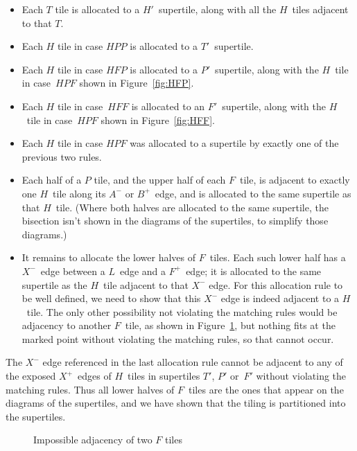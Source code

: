 \begin{itemize}
  \item Each $T$ tile is allocated to a $H'$~supertile, along with all
    the $H$~tiles adjacent to that $T$.
  \item Each $H$ tile in case $HPP$ is allocated to a $T'$~supertile.
  \item Each $H$ tile in case $HFP$ is allocated to a $P'$~supertile,
    along with the $H$~tile in case~$HPF$ shown in
    Figure~\ref{fig:HFP}.
  \item Each $H$ tile in case~$HFF$ is allocated to an $F'$~supertile,
    along with the $H$~tile in case~$HPF$ shown in
    Figure~\ref{fig:HFF}.
  \item Each $H$ tile in case $HPF$ was allocated to a supertile by
    exactly one of the previous two rules.
  \item Each half of a $P$ tile, and the upper half of each $F$~tile,
    is adjacent to exactly one $H$~tile along its $A^-$ or $B^+$~edge,
    and is allocated to the same supertile as that $H$~tile.  (Where
    both halves are allocated to the same supertile, the bisection
    isn't shown in the diagrams of the supertiles, to simplify those
    diagrams.)
  \item It remains to allocate the lower halves of $F$~tiles.  Each
    such lower half has a $X^-$~edge between a $L$~edge and a
    $F^+$~edge; it is allocated to the same supertile as the $H$~tile
    adjacent to that $X^-$ edge.  For this allocation rule to be
	well defined, we need to show that this $X^-$ edge is indeed
    adjacent to a $H$~tile.  The only other possibility not violating
    the matching rules would be adjacency to another $F$~tile, as
    shown in Figure~\ref{fig:FF}, but nothing fits at the marked point
    without violating the matching rules, so that cannot occur.
\end{itemize}

The $X^-$ edge referenced in the last allocation rule cannot be
adjacent to any of the exposed $X^+$~edges of $H$~tiles in supertiles
$T'$, $P'$ or~$F'$ without violating the matching rules.  Thus all
lower halves of $F$~tiles are the ones that appear on the diagrams of
the supertiles, and we have shown that the tiling is partitioned into
the supertiles.

\begin{figure}[htp!]
\begin{center}
\end{center}
\caption{Impossible adjacency of two $F$ tiles}
\label{fig:FF}
\end{figure}

